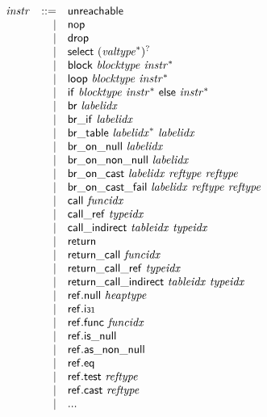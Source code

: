 \documentclass[a4paper]{scrartcl}
\begin{document}
$$
\begin{array}{@{}l@{}rrl@{}l@{}}
& {\mathit{instr}} &::=& \mathsf{unreachable} \\ &&|&
\mathsf{nop} \\ &&|&
\mathsf{drop} \\ &&|&
\mathsf{select}~{({{\mathit{valtype}}^\ast})^?} \\ &&|&
\mathsf{block}~{\mathit{blocktype}}~{{\mathit{instr}}^\ast} \\ &&|&
\mathsf{loop}~{\mathit{blocktype}}~{{\mathit{instr}}^\ast} \\ &&|&
\mathsf{if}~{\mathit{blocktype}}~{{\mathit{instr}}^\ast}~\mathsf{else}~{{\mathit{instr}}^\ast} \\ &&|&
\mathsf{br}~{\mathit{labelidx}} \\ &&|&
\mathsf{br\_if}~{\mathit{labelidx}} \\ &&|&
\mathsf{br\_table}~{{\mathit{labelidx}}^\ast}~{\mathit{labelidx}} \\ &&|&
\mathsf{br\_on\_null}~{\mathit{labelidx}} \\ &&|&
\mathsf{br\_on\_non\_null}~{\mathit{labelidx}} \\ &&|&
\mathsf{br\_on\_cast}~{\mathit{labelidx}}~{\mathit{reftype}}~{\mathit{reftype}} \\ &&|&
\mathsf{br\_on\_cast\_fail}~{\mathit{labelidx}}~{\mathit{reftype}}~{\mathit{reftype}} \\ &&|&
\mathsf{call}~{\mathit{funcidx}} \\ &&|&
\mathsf{call\_ref}~{\mathit{typeidx}} \\ &&|&
\mathsf{call\_indirect}~{\mathit{tableidx}}~{\mathit{typeidx}} \\ &&|&
\mathsf{return} \\ &&|&
\mathsf{return\_call}~{\mathit{funcidx}} \\ &&|&
\mathsf{return\_call\_ref}~{\mathit{typeidx}} \\ &&|&
\mathsf{return\_call\_indirect}~{\mathit{tableidx}}~{\mathit{typeidx}} \\ &&|&
\mathsf{ref.null}~{\mathit{heaptype}} \\ &&|&
\mathsf{ref.i{\scriptstyle31}} \\ &&|&
\mathsf{ref.func}~{\mathit{funcidx}} \\ &&|&
\mathsf{ref.is\_null} \\ &&|&
\mathsf{ref.as\_non\_null} \\ &&|&
\mathsf{ref.eq} \\ &&|&
\mathsf{ref.test}~{\mathit{reftype}} \\ &&|&
\mathsf{ref.cast}~{\mathit{reftype}} \\ &&|&
... \\
\end{array}
$$
\end{document}
